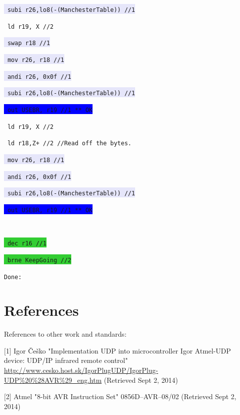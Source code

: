 \documentclass{article}
\begin{document}
\texttt{\colorbox{Lavender}{	subi r26,lo8(-(ManchesterTable)) //1} }

\texttt{\colorbox{Apricot}{	ld r19, X      //2} }

\texttt{\colorbox{Lavender}{	swap r18       //1} }

\texttt{\colorbox{Lavender}{	mov r26, r18   //1} }

\texttt{\colorbox{Lavender}{	andi r26, 0x0f //1} }

\texttt{\colorbox{Lavender}{	subi r26,lo8(-(ManchesterTable)) //1} }

\texttt{\colorbox{blue}{	out USEBR, r19 //1 ** OK} }

\texttt{\colorbox{Apricot}{	ld r19, X      //2} }

\texttt{\colorbox{RedOrange}{	ld r18,Z+      //2  //Read off the bytes.} }

\texttt{\colorbox{Lavender}{	mov r26, r18   //1} }

\texttt{\colorbox{Lavender}{	andi r26, 0x0f //1} }

\texttt{\colorbox{Lavender}{	subi r26,lo8(-(ManchesterTable)) //1} }

\texttt{\colorbox{blue}{	out USEBR, r19 //1 ** OK} }

\texttt{\colorbox{White}{} }

\texttt{\colorbox{LimeGreen}{	dec r16         //1} }

\texttt{\colorbox{LimeGreen}{	brne KeepGoing  //2} }

\texttt{\colorbox{White}{Done:} }
\label{lst:sendasmtest}



\section{References}
References to other work and standards:

[1] Igor Češko "Implementation UDP into microcontroller Igor Atmel-UDP device: UDP/IP infrared remote control" \url{http://www.cesko.host.sk/IgorPlugUDP/IgorPlug-UDP%20%28AVR%29_eng.htm} (Retrieved Sept 2, 2014)

[2] Atmel "8-bit AVR Instruction Set" 0856D–AVR–08/02 (Retrieved Sept 2, 2014)
\end{document}
